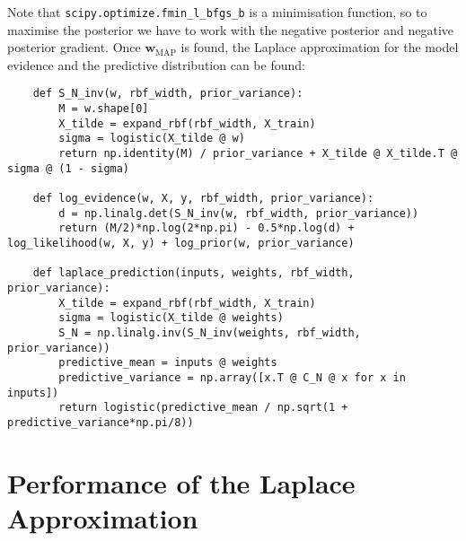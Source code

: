 \documentclass[a4paper]{article}
\begin{document}
    Note that \verb`scipy.optimize.fmin_l_bfgs_b` is a minimisation function, so to maximise the posterior we have to work with the negative posterior and negative posterior gradient.
    Once $\bm{w}_{\text{MAP}}$ is found, the Laplace approximation for the model evidence and the predictive distribution can be found:
    \begin{verbatim}
    def S_N_inv(w, rbf_width, prior_variance):
        M = w.shape[0]
        X_tilde = expand_rbf(rbf_width, X_train)
        sigma = logistic(X_tilde @ w)
        return np.identity(M) / prior_variance + X_tilde @ X_tilde.T @ sigma @ (1 - sigma)

    def log_evidence(w, X, y, rbf_width, prior_variance):
        d = np.linalg.det(S_N_inv(w, rbf_width, prior_variance))
        return (M/2)*np.log(2*np.pi) - 0.5*np.log(d) + log_likelihood(w, X, y) + log_prior(w, prior_variance)

    def laplace_prediction(inputs, weights, rbf_width, prior_variance):
        X_tilde = expand_rbf(rbf_width, X_train)
        sigma = logistic(X_tilde @ weights)
        S_N = np.linalg.inv(S_N_inv(weights, rbf_width, prior_variance))
        predictive_mean = inputs @ weights
        predictive_variance = np.array([x.T @ C_N @ x for x in inputs])
        return logistic(predictive_mean / np.sqrt(1 + predictive_variance*np.pi/8))
    \end{verbatim}

    \section{Performance of the Laplace Approximation}
\end{document}
